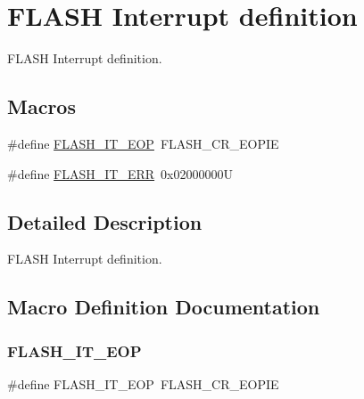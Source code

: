 \hypertarget{group___f_l_a_s_h___interrupt__definition}{}\section{F\+L\+A\+SH Interrupt definition}
\label{group___f_l_a_s_h___interrupt__definition}


F\+L\+A\+SH Interrupt definition.  


\subsection*{Macros}
\begin{DoxyCompactItemize}
\item 
\#define \mbox{\hyperlink{group___f_l_a_s_h___interrupt__definition_gaea20e80e1806d58a7544cfe8659e7f11}{F\+L\+A\+S\+H\+\_\+\+I\+T\+\_\+\+E\+OP}}~F\+L\+A\+S\+H\+\_\+\+C\+R\+\_\+\+E\+O\+P\+IE
\item 
\#define \mbox{\hyperlink{group___f_l_a_s_h___interrupt__definition_ga4e2c23ab8c1b9a5ee49bf6d695d9ae8c}{F\+L\+A\+S\+H\+\_\+\+I\+T\+\_\+\+E\+RR}}~0x02000000U
\end{DoxyCompactItemize}


\subsection{Detailed Description}
F\+L\+A\+SH Interrupt definition. 



\subsection{Macro Definition Documentation}
\mbox{\label{group___f_l_a_s_h___interrupt__definition_gaea20e80e1806d58a7544cfe8659e7f11}} 
\subsubsection{\texorpdfstring{F\+L\+A\+S\+H\+\_\+\+I\+T\+\_\+\+E\+OP}{FLASH\_IT\_EOP}}
{\footnotesize\ttfamily \#define F\+L\+A\+S\+H\+\_\+\+I\+T\+\_\+\+E\+OP~F\+L\+A\+S\+H\+\_\+\+C\+R\+\_\+\+E\+O\+P\+IE}

